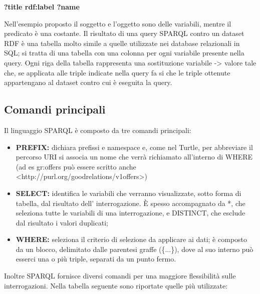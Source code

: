 \documentclass[a4paper,11pt]{article}
\begin{document}
\begin{center}	
	\textbf{?title rdf:label ?name}
\end{center}

Nell'esempio proposto il soggetto e l'oggetto sono delle variabili, mentre il predicato è una costante.
Il risultato di una query SPARQL contro un dataset RDF è una tabella molto simile a quelle utilizzate nei database relazionali in SQL; si tratta di una tabella con una colonna per ogni variabile presente nella query. Ogni riga della tabella rappresenta una sostituzione variabile -> valore tale che, se applicata alle triple indicate nella query fa si che le triple ottenute appartengano al dataset contro cui è eseguita la query.

\subsection{Comandi principali}
\label{sec:4.1}
Il linguaggio SPARQL è composto da tre comandi principali:
\begin{itemize}
	\item \textbf{PREFIX:} dichiara prefissi e namespace e, come nel Turtle, per
abbreviare il percorso URI si associa un nome che verrà
richiamato all'interno di WHERE (ad es gr:offers può essere
scritto anche <http://purl.org/goodrelations/v1offers>)
	\item \textbf{SELECT:} identifica le variabili che verranno visualizzate, sotto forma di tabella, dal risultato dell' interrogazione. È spesso
accompagnato da *, che seleziona tutte le variabili di una
interrogazione, e DISTINCT, che esclude dal risultato i valori
duplicati;
	\item \textbf{WHERE:} seleziona il criterio di selezione da applicare ai dati; è composto da un blocco, delimitato dalle parentesi graffe (\{...\}),
dove al suo interno può esserci una o più triple, separati da un
punto fermo.
	\end{itemize}
Inoltre SPARQL fornisce diversi comandi per una maggiore flessibilità sulle interrogazioni. Nella tabella seguente sono riportate quelle più utilizzate:
\end{document}

